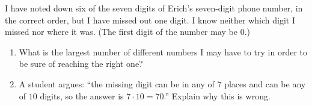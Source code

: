 I have noted down six of the seven digits of Erich's seven-digit phone number, in the correct order, but I have missed out one digit. I know neither which digit I missed nor where it was. (The first digit of the number may be $0$.)
\begin{enumerate}
\item[(a)] What is the largest number of different numbers I may have to try in order to be sure of reaching the right one?
\item[(b)] A student argues: ``the missing digit can be in any of $7$ places and can be any of $10$ digits, so the answer is $7\cdot10=70$.'' Explain why this is wrong.
\end{enumerate}

